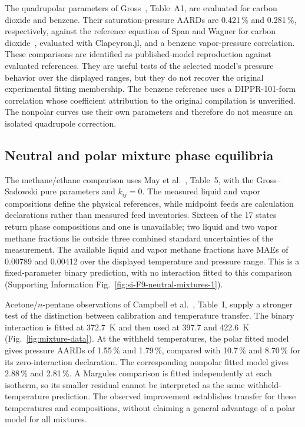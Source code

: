 The quadrupolar parameters of Gross~\citep{grossEquationofstateContributionPolar2005}, Table~A1, are evaluated for carbon dioxide and benzene.
Their saturation-pressure AARDs are 0.421\,\% and 0.281\,\%, respectively, against the reference equation of Span and Wagner for carbon dioxide~\citep{spanNewEquationState1996}, evaluated with Clapeyron.jl, and a benzene vapor-pressure correlation.
These comparisons are identified as published-model reproduction against evaluated references.
They are useful tests of the selected model's pressure behavior over the displayed ranges, but they do not recover the original experimental fitting membership.
The benzene reference uses a DIPPR-101-form correlation whose coefficient attribution to the original compilation is unverified.
The nonpolar curves use their own parameters and therefore do not measure an isolated quadrupole correction.



\subsection{Neutral and polar mixture phase equilibria}
The methane/ethane comparison uses May et al.~\citep{May2015}, Table~5, with the Gross--Sadowski pure parameters and $k_{ij}=0$.
The measured liquid and vapor compositions define the physical references, while midpoint feeds are calculation declarations rather than measured feed inventories.
Sixteen of the 17 states return phase compositions and one is unavailable; two liquid and two vapor methane fractions lie outside three combined standard uncertainties of the measurement.
The available liquid and vapor methane fractions have MAEs of 0.00789 and 0.00412 over the displayed temperature and pressure range.
This is a fixed-parameter binary prediction, with no interaction fitted to this comparison (Supporting Information Fig.~\ref{fig:si-F9-neutral-mixtures-1}).

Acetone/$n$-pentane observations of Campbell et al.~\citep{Campbell1986}, Table~I, supply a stronger test of the distinction between calibration and temperature transfer.
The binary interaction is fitted at 372.7~K and then used at 397.7 and 422.6~K (Fig.~\ref{fig:mixture-data}).
At the withheld temperatures, the polar fitted model gives pressure AARDs of 1.55\,\% and 1.79\,\%, compared with 10.7\,\% and 8.70\,\% for its zero-interaction declaration.
The corresponding nonpolar fitted model gives 2.88\,\% and 2.81\,\%.
A Margules comparison is fitted independently at each isotherm, so its smaller residual cannot be interpreted as the same withheld-temperature prediction.
The observed improvement establishes transfer for these temperatures and compositions, without claiming a general advantage of a polar model for all mixtures.

